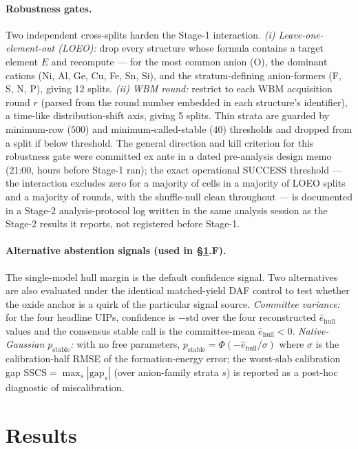 \documentclass[aip,jcp,preprint,superscriptaddress,amsmath,amssymb]{revtex4-2}
\begin{document}
\paragraph{Robustness gates.} Two independent cross-splits harden the Stage-1 interaction.
\emph{(i) Leave-one-element-out (LOEO):} drop every structure whose formula contains a
target element $E$ and recompute --- for the most common anion (O), the dominant cations
(Ni, Al, Ge, Cu, Fe, Sn, Si), and the stratum-defining anion-formers (F, S, N, P), giving 12
splits. \emph{(ii) WBM round:} restrict to each WBM acquisition round $r$ (parsed from
the round number embedded in each structure's identifier), a time-like distribution-shift axis,
giving 5 splits. Thin strata are guarded by minimum-row ($500$) and minimum-called-stable
($40$) thresholds and dropped from a split if below threshold. The general direction and
kill criterion for this robustness gate were committed ex ante in
a dated pre-analysis design memo (21:00, hours before Stage-1 ran); the exact operational
SUCCESS threshold --- the interaction excludes zero for a majority of cells in a majority of
LOEO splits and a majority of rounds, with the shuffle-null clean throughout --- is
documented in a Stage-2 analysis-protocol log written in the
same analysis session as the Stage-2 results it reports, not registered before Stage-1.

\paragraph{Alternative abstention signals (used in \S\ref{sec:results}.F).} The single-model
hull margin is the default confidence signal. Two alternatives are also evaluated under the
identical matched-yield DAF control to test whether the oxide anchor is a quirk of the
particular signal source. \emph{Committee variance:} for the four headline UIPs,
confidence is $-\mathrm{std}$ over the four reconstructed $\hat{e}_{\mathrm{hull}}$ values
and the consensus stable call is the committee-mean $\hat{e}_{\mathrm{hull}} < 0$.
\emph{Native-Gaussian $p_{\mathrm{stable}}$:} with no free parameters,
$p_{\mathrm{stable}} = \Phi(-\hat{e}_{\mathrm{hull}}/\sigma)$ where $\sigma$ is the
calibration-half RMSE of the formation-energy error; the worst-slab calibration gap
$\mathrm{SSCS} = \max_s |\mathrm{gap}_s|$ (over anion-family strata $s$) is reported as a
post-hoc diagnostic of miscalibration.

\vspace{-1.5em}
\section{Results}\label{sec:results}
\end{document}
